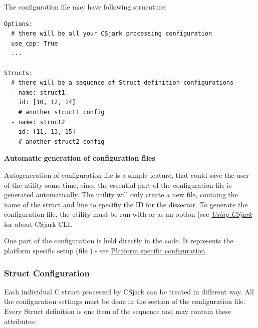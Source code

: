 \documentclass[A4paper,10pt,english]{sphinxmanual}
\begin{document}
The configuration file may have following strucuture:

\begin{Verbatim}[commandchars=\\\{\}]
Options:
  # there will be all your CSjark processing configuration
  use_cpp: True
  ...

Structs:
  # there will be a sequence of Struct definition configurations
  - name: struct1
    id: [10, 12, 14]
    # another struct1 config
  - name: struct2
    id: [11, 13, 15]
    # another struct2 config
\end{Verbatim}

\textbf{Automatic generation of configuration files}

Autogeneration of configuration file is a simple feature, that could save the user of the utility some time, since  the essential part of the configuration file is generated automatically.  The utility will only create a new file, containg the name of the struct and line to specifiy the ID for the dissector.  To generate the configuration file, the utility must be run with  or  as an option (see {\hyperref[user/use:use]{\emph{Using CSjark}}} for about CSjark CLI.

One part of the configuration is held directly in the code. It represents the platform specific setup (file ) - see {\hyperref[user/config:platform-specific-configuration]{Platform specific configuration}}.


\subsubsection{Struct Configuration}
\label{user/config:struct-configuration}
Each individual C struct processed by CSjark can be treated in different way. All the configuration settings must be done in the  section of the configuration file. Every Struct definition is one item of the sequence and may contain these attributes:
\end{document}
